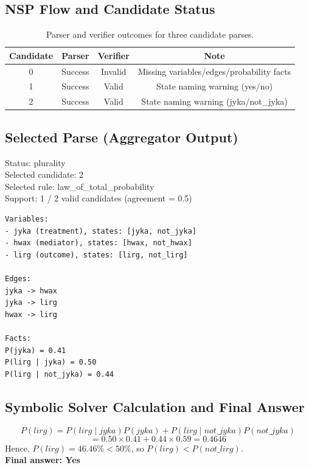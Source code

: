 \documentclass{article}
\theoremstyle{plain}
\theoremstyle{definition}
\theoremstyle{remark}
\begin{document}
\subsection{NSP Flow and Candidate Status}
\begin{table}[H]
\centering
\small
\begin{tabular}{cccc}
\toprule
Candidate & Parser & Verifier & Note \\
\midrule
0 & Success & Invalid & Missing variables/edges/probability facts \\
1 & Success & Valid & State naming warning (yes/no) \\
2 & Success & Valid & State naming warning (jyka/not\_jyka) \\
\bottomrule
\end{tabular}
\caption{Parser and verifier outcomes for three candidate parses.}
\label{tab:nsp_candidate_status}
\end{table}

\subsection{Selected Parse (Aggregator Output)}
\begin{tcolorbox}[colback=white, colframe=black!75, title=Aggregator Decision]
\small
Status: plurality \\
Selected candidate: 2 \\
Selected rule: law\_of\_total\_probability \\
Support: 1 / 2 valid candidates (agreement = 0.5)
\end{tcolorbox}

\begin{lstlisting}[backgroundcolor=\color{blue!5}, frame=single, breaklines=true, basicstyle=\ttfamily\small, caption={Selected causal structure and probability facts}]
Variables:
- jyka (treatment), states: [jyka, not_jyka]
- hwax (mediator), states: [hwax, not_hwax]
- lirg (outcome), states: [lirg, not_lirg]

Edges:
jyka -> hwax
jyka -> lirg
hwax -> lirg

Facts:
P(jyka) = 0.41
P(lirg | jyka) = 0.50
P(lirg | not_jyka) = 0.44
\end{lstlisting}

\subsection{Symbolic Solver Calculation and Final Answer}
\begin{tcolorbox}[colback=white, colframe=black!75, title=Law of Total Probability]
\small
\[
P(lirg)=P(lirg\mid jyka)P(jyka)+P(lirg\mid not\_jyka)P(not\_jyka)
\]
\[
=0.50\times0.41 + 0.44\times0.59 = 0.4646
\]
Hence, \(P(lirg)=46.46\% < 50\%\), so \(P(lirg) < P(not\_lirg)\). \\
\textbf{Final answer: Yes}
\end{tcolorbox}

\end{document}
